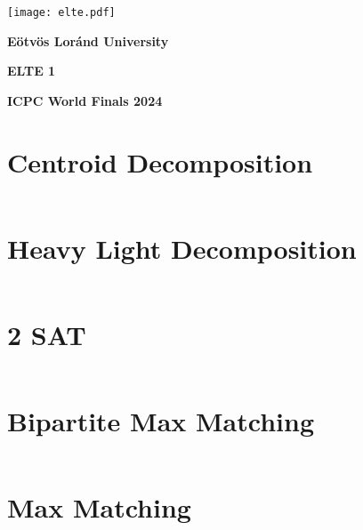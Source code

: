 \documentclass[12pt,english]{article}
\begin{document}
\begin{titlepage}
    \begin{center}
        \vspace*{\fill}
        \texttt{[image: elte.pdf]}

        \vspace*{0.5cm}
        
        \textbf{Eötvös Loránd University}
        
        \vspace*{1cm}
        
        {\Huge \textbf{ELTE 1}}
        \vspace*{\fill}
             
        \textbf{ICPC World Finals 2024}
    \end{center}
 \end{titlepage}

\section{Centroid Decomposition}
\inputminted[autogobble,breaklines,mathescape,linenos,numbersep=5pt,xleftmargin=0pt,fontsize=\footnotesize]{cpp}{codes/centroid.tex}

\section{Heavy Light Decomposition}
\inputminted[autogobble,breaklines,mathescape,linenos,numbersep=5pt,xleftmargin=0pt,fontsize=\footnotesize]{cpp}{codes/heavylight.tex}

\section{2 SAT}
\inputminted[autogobble,breaklines,mathescape,linenos,numbersep=5pt,xleftmargin=0pt,fontsize=\footnotesize]{cpp}{codes/2sat.tex}

\section{Bipartite Max Matching}
\inputminted[autogobble,breaklines,mathescape,linenos,numbersep=5pt,xleftmargin=0pt,fontsize=\footnotesize]{cpp}{codes/hopcroft_carp.tex}

\section{Max Matching}
\inputminted[autogobble,breaklines,mathescape,linenos,numbersep=5pt,xleftmargin=0pt,fontsize=\footnotesize]{cpp}{codes/max_matching.tex}
\end{document}
